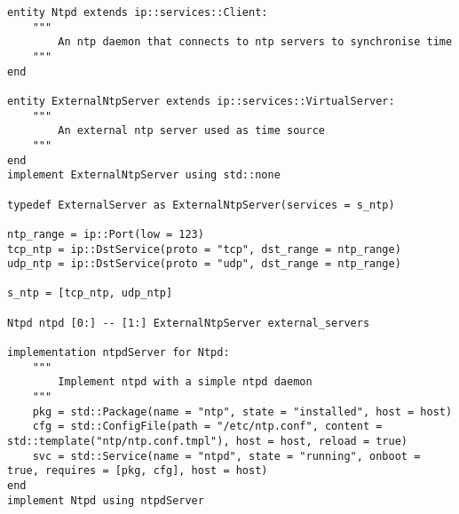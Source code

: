 \begin{minipage}
\begin{lstlisting}[label=listing:NTP_model]
entity Ntpd extends ip::services::Client:
    """
        An ntp daemon that connects to ntp servers to synchronise time 
    """
end

entity ExternalNtpServer extends ip::services::VirtualServer:
    """
        An external ntp server used as time source    
    """
end
implement ExternalNtpServer using std::none

typedef ExternalServer as ExternalNtpServer(services = s_ntp)

ntp_range = ip::Port(low = 123)
tcp_ntp = ip::DstService(proto = "tcp", dst_range = ntp_range)
udp_ntp = ip::DstService(proto = "udp", dst_range = ntp_range)

s_ntp = [tcp_ntp, udp_ntp]

Ntpd ntpd [0:] -- [1:] ExternalNtpServer external_servers

implementation ntpdServer for Ntpd:
    """
        Implement ntpd with a simple ntpd daemon
    """
    pkg = std::Package(name = "ntp", state = "installed", host = host)
    cfg = std::ConfigFile(path = "/etc/ntp.conf", content = std::template("ntp/ntp.conf.tmpl"), host = host, reload = true)
    svc = std::Service(name = "ntpd", state = "running", onboot = true, requires = [pkg, cfg], host = host)
end
implement Ntpd using ntpdServer
\end{lstlisting}
\end{minipage}
